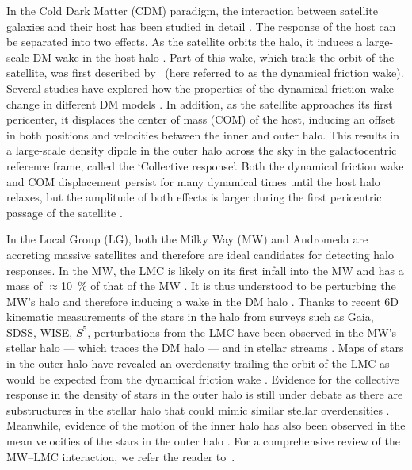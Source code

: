 \documentclass[twocolumn, linenumbers]{openjournal}
\begin{document}
In the Cold Dark Matter (CDM) paradigm, the interaction between satellite galaxies and their host has 
been studied in detail \citep[e.g,][]{Weinberg98, Choi09, choiphdt, Trelles22}. The response of the 
host can be separated into two effects. As the satellite orbits the halo, it induces a large-scale 
DM wake in the host halo \citep[e.g.,][]{TW84, Ogiya_16}. Part of this wake, which trails the orbit
of the satellite, was first described by~\cite{Chandrasekhar1943} (here referred to as the dynamical 
friction wake). Several studies have explored how the properties of the dynamical friction wake 
change in different DM models \citep[e.g., ][]{lancaster20, Foote_23}. In addition, as the 
satellite approaches its first pericenter, it displaces the center of mass (COM) of the host, 
inducing an offset in both positions and velocities between the inner and outer halo. This results 
in a large-scale density dipole in the outer halo across the sky in the galactocentric reference 
frame, called the `Collective response'. Both the dynamical friction wake and COM displacement 
persist for many dynamical times until the host halo relaxes, but the amplitude of both effects 
is larger during the first pericentric passage of the satellite \citep[e.g.,][]{Weinberg_23}.

In the Local Group (LG), both the Milky Way (MW) and Andromeda are accreting massive 
satellites and therefore are ideal candidates for detecting halo responses. In the MW, 
the LMC is likely on its first infall into the MW \citep{besla07, Kallivayalil13} and has 
a mass of $\approx$10~\%  of that of the MW \citep{Watkins_24}. It is thus 
understood to be perturbing the MW's halo and therefore inducing a wake in the 
DM halo \citep[e.g.,][]{garavito_19, Tamfal_21, Simon_22}. Thanks to recent 6D 
kinematic measurements of the stars in the halo from surveys such as Gaia, SDSS, 
WISE, $S^5$, perturbations from the LMC  have been observed in the MW's stellar 
halo --- which traces the DM halo --- and in stellar streams \citep{Shipp19, Koposov19}. 
Maps of stars in the outer halo have revealed an overdensity trailing the orbit of the LMC as 
would be expected from the dynamical friction wake \citep{belokurov19, Conroy_2021, Fushimi_23, Amarante_24}. 
Evidence for the collective response in the density of stars in the outer halo is still under debate 
as there are substructures in the stellar halo that could mimic similar stellar overdensities 
\citep{Cunninghnam_20, Amarante_24}. Meanwhile, evidence of the motion of the inner halo has 
also been observed in the mean velocities of the stars in the outer halo 
\citep{Petersen_21, Erkal_21, Yaaqib_24}. For a comprehensive review of the MW--LMC interaction, 
we refer the reader to~\cite{Vasiliev_23review}. 
\end{document}
